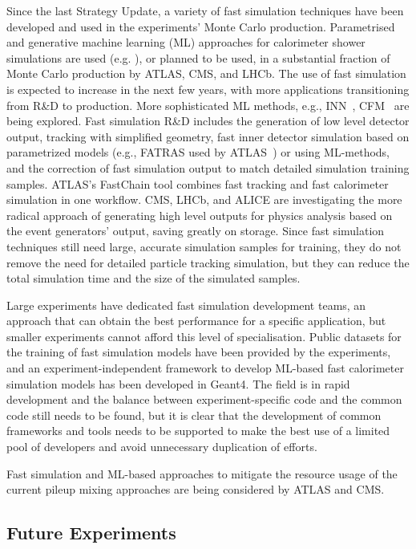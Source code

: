 \documentclass[10pt,a4paper]{article}
\begin{document}
Since the last Strategy Update\cite{European:2720131}, a variety of fast simulation
techniques have been developed and used in the experiments' Monte Carlo
production. Parametrised and generative machine learning (ML) approaches for
calorimeter shower simulations are used (e.g. \cite{af3}), or planned to be
used, in a substantial fraction of Monte Carlo production by ATLAS, CMS, and
LHCb. The use of fast simulation is expected to increase in the next few years,
with more applications transitioning from R\&D to production. More sophisticated
ML methods, e.g., INN~\cite{kim2021innmethodidentifyingcleanannotated},
CFM~\cite{tong2024improvinggeneralizingflowbasedgenerative} are being explored.
Fast simulation R\&D includes the generation of low level detector output,
tracking with simplified geometry, fast inner detector simulation based on
parametrized models (e.g., FATRAS used by ATLAS~\cite{fatras}) or using
ML-methods, and the correction of fast simulation output to match detailed
simulation training samples. ATLAS's FastChain tool combines fast tracking and
fast calorimeter simulation in one workflow. CMS, LHCb, and ALICE are
investigating the more radical approach of generating high level outputs for
physics analysis based on the event generators' output, saving greatly on
storage. Since fast simulation techniques still need large, accurate simulation
samples for training, they do not remove the need for detailed particle tracking
simulation, but they can reduce the total simulation time and the size of the
simulated samples.

Large experiments have dedicated fast simulation development teams, an approach
that can obtain the best performance for a specific application, but smaller
experiments cannot afford this level of specialisation. Public datasets for the
training of fast simulation models have been provided by the experiments, and an
experiment-independent framework to develop ML-based fast calorimeter simulation
models has been developed in Geant4. The field is in rapid development and the
balance between experiment-specific code and the common code still needs to be
found, but it is clear that the development of common frameworks and tools needs
to be supported to make the best use of a limited pool of developers and avoid
unnecessary duplication of efforts.

Fast simulation and ML-based approaches to mitigate the resource usage
of the current pileup mixing approaches are being considered by ATLAS
and CMS.

\subsection{Future Experiments}\label{future-experiments}
\end{document}
